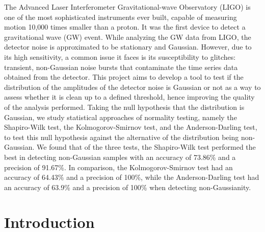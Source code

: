 \documentclass[12pt]{article}
\begin{document}
\noindent The Advanced Laser Interferometer Gravitational-wave Observatory (LIGO) is one of the most sophisticated instruments ever built, capable of measuring motion 10,000 times smaller than a proton. It was the first device to detect a gravitational wave (GW) event. While analyzing the GW data from LIGO, the detector noise is approximated to be stationary and Gaussian. However, due to its high sensitivity, a common issue it faces is its susceptibility to glitches: transient, non-Gaussian noise bursts that contaminate the time series data obtained from the detector. This project aims to develop a tool to test if the distribution of the amplitudes of the detector noise is Gaussian or not as a way to assess whether it is clean up to a defined threshold, hence improving the quality of the analysis performed. Taking the null hypothesis that the distribution is Gaussian, we study statistical approaches of normality testing, namely the Shapiro-Wilk test, the Kolmogorov-Smirnov test, and the Anderson-Darling test, to test this null hypothesis against the alternative of the distribution being non-Gaussian. We found that of the three tests, the Shapiro-Wilk test performed the best in detecting non-Gaussian samples with an accuracy of 73.86\% and a precision of 91.67\%. In comparison, the Kolmogorov-Smirnov test had an accuracy of 64.43\% and a precision of 100\%, while the Anderson-Darling test had an accuracy of 63.9\% and a precision of 100\% when detecting non-Gaussianity. 


\section{Introduction}\label{Introduction}
\end{document}
